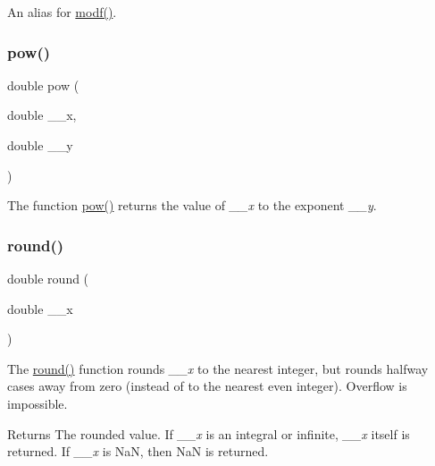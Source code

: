 An alias for \hyperlink{group__avr__math_ga85861fee92c0904e9bb7a9875ee77579}{modf()}. \mbox{\label{group__avr__math_gaa9a9885e972736204c941a7e9db0ffe2}} 
\subsubsection{\texorpdfstring{pow()}{pow()}}
{\footnotesize\ttfamily double pow (\begin{DoxyParamCaption}\item[{double}]{\+\_\+\+\_\+x,  }\item[{double}]{\+\_\+\+\_\+y }\end{DoxyParamCaption})}

The function \hyperlink{group__avr__math_gaa9a9885e972736204c941a7e9db0ffe2}{pow()} returns the value of {\itshape \+\_\+\+\_\+x} to the exponent {\itshape \+\_\+\+\_\+y}. \mbox{\label{group__avr__math_ga79dbf1906373fcc3bf5edf1ec91674cc}} 
\subsubsection{\texorpdfstring{round()}{round()}}
{\footnotesize\ttfamily double round (\begin{DoxyParamCaption}\item[{double}]{\+\_\+\+\_\+x }\end{DoxyParamCaption})}

The \hyperlink{group__avr__math_ga79dbf1906373fcc3bf5edf1ec91674cc}{round()} function rounds {\itshape \+\_\+\+\_\+x} to the nearest integer, but rounds halfway cases away from zero (instead of to the nearest even integer). Overflow is impossible.

\begin{DoxyReturn}{Returns}
The rounded value. If {\itshape \+\_\+\+\_\+x} is an integral or infinite, {\itshape \+\_\+\+\_\+x} itself is returned. If {\itshape \+\_\+\+\_\+x} is {\ttfamily NaN}, then {\ttfamily NaN} is returned. 
\end{DoxyReturn}
\mbox{\label{group__avr__math_ga630a57ee687f001f8e5a218c9b79f50b}} 
